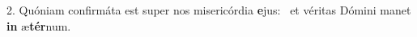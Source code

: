 2. Quóniam confirmáta est super nos misericórdia \textbf{e}jus: \ast\  et véritas Dómini manet \textbf{in} æ\textbf{tér}num.\


